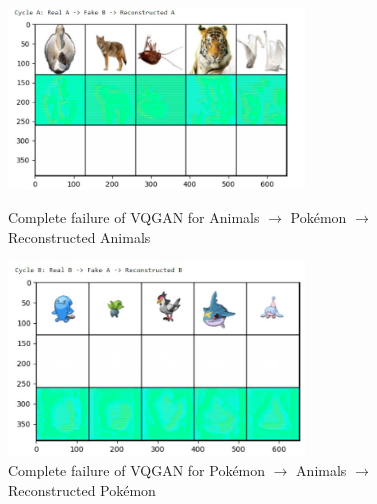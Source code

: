 \documentclass[twoside,english,notitlepage]{report}
\begin{document}
\begin{figure}[h]
    \centering
    \includegraphics[width=0.7\textwidth]{task2/failedvq1.jpg}
    \vspace{-10pt}
    \caption{Complete failure of VQGAN for Animals $\rightarrow$ Pokémon $\rightarrow$ Reconstructed Animals}
    \vspace{12pt}
    \includegraphics[width=0.7\textwidth]{task2/failedvq2.jpg}
    \vspace{-10pt}
    \caption{Complete failure of VQGAN for Pokémon $\rightarrow$ Animals $\rightarrow$ Reconstructed Pokémon}
    \vspace{12pt}
    \label{fig:failed-vq}
\end{figure}



\end{document}

